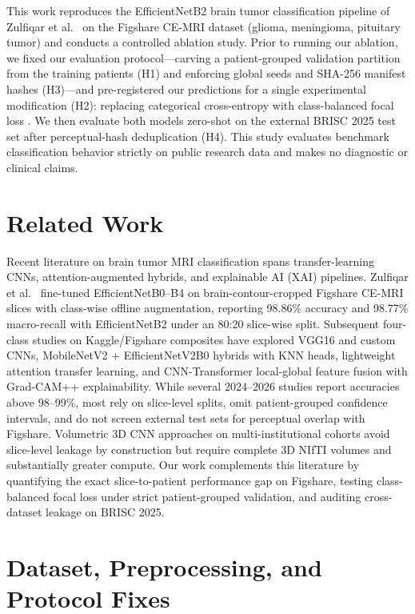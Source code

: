\documentclass[conference]{IEEEtran}
\begin{document}
This work reproduces the EfficientNetB2 brain tumor classification pipeline of Zulfiqar et al.\ \cite{zulfiqar2023efficientnet} on the Figshare CE-MRI dataset (glioma, meningioma, pituitary tumor) and conducts a controlled ablation study. Prior to running our ablation, we fixed our evaluation protocol—carving a patient-grouped validation partition from the training patients (H1) and enforcing global seeds and SHA-256 manifest hashes (H3)—and pre-registered our predictions for a single experimental modification (H2): replacing categorical cross-entropy with class-balanced focal loss \cite{lin2017focal,cui2019class}. We then evaluate both models zero-shot on the external BRISC 2025 test set \cite{fateh2025brisc} after perceptual-hash deduplication (H4). This study evaluates benchmark classification behavior strictly on public research data and makes no diagnostic or clinical claims.

\section{Related Work}
Recent literature on brain tumor MRI classification spans transfer-learning CNNs, attention-augmented hybrids, and explainable AI (XAI) pipelines. Zulfiqar et al.\ \cite{zulfiqar2023efficientnet} fine-tuned EfficientNetB0--B4 on brain-contour-cropped Figshare CE-MRI slices with class-wise offline augmentation, reporting 98.86\% accuracy and 98.77\% macro-recall with EfficientNetB2 under an 80:20 slice-wise split. Subsequent four-class studies on Kaggle/Figshare composites have explored VGG16 and custom CNNs, MobileNetV2 + EfficientNetV2B0 hybrids with KNN heads, lightweight attention transfer learning, and CNN-Transformer local-global feature fusion with Grad-CAM++ explainability. While several 2024--2026 studies report accuracies above 98--99\%, most rely on slice-level splits, omit patient-grouped confidence intervals, and do not screen external test sets for perceptual overlap with Figshare. Volumetric 3D CNN approaches on multi-institutional cohorts avoid slice-level leakage by construction but require complete 3D NIfTI volumes and substantially greater compute. Our work complements this literature by quantifying the exact slice-to-patient performance gap on Figshare, testing class-balanced focal loss under strict patient-grouped validation, and auditing cross-dataset leakage on BRISC 2025.

\section{Dataset, Preprocessing, and Protocol Fixes}
\end{document}
